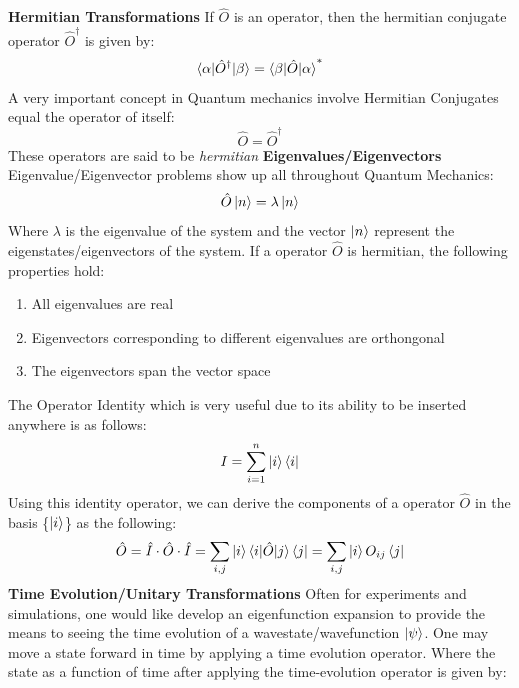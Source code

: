 \textbf{Hermitian Transformations} \newline
If $\hat{O}$ is an operator, then the hermitian conjugate operator $\hat{O}^{\dagger}$ is given by:
\begin{equation}
    \braket{\alpha|\hat{O}^{\dagger}|\beta} = \braket{\beta|\hat{O}|\alpha}^{*}
\end{equation}
A very important concept in Quantum mechanics involve Hermitian Conjugates equal the operator of itself:
\begin{equation}
    \hat{O} = \hat{O}^{\dagger}
\end{equation}
These operators are said to be \textit{hermitian} \newline
\textbf{Eigenvalues/Eigenvectors} \newline
Eigenvalue/Eigenvector problems show up all throughout Quantum Mechanics:
\begin{equation}
    \hat{O}\ket{n} = \lambda \ket{n}
\end{equation}
Where $\lambda$ is the eigenvalue of the system and the vector $\ket{n}$ represent the eigenstates/eigenvectors of the system. \newline
If a operator $\hat{O}$ is hermitian, the following properties hold:
\begin{enumerate}
    \item All eigenvalues are real 
    \item Eigenvectors corresponding to different eigenvalues are orthongonal 
    \item The eigenvectors span the vector space
\end{enumerate}
The Operator Identity which is very useful due to its ability to be inserted anywhere is as follows: 
\begin{equation}
    I = \sum_{i=1}^{n} \ket{i}\bra{i}
\end{equation}
Using this identity operator, we can derive the components of a operator $\hat{O}$ in the basis \{$\ket{i}$\} as the following:
\begin{equation}
    \hat{O} = \hat{I} \cdot \hat{O} \cdot \hat{I} = \sum_{i,j} \ket{i}\braket{i|\hat{O}|j}\bra{j} = \sum_{i,j} \ket{i}O_{ij}\bra{j}
\end{equation}
\textbf{Time Evolution/Unitary Transformations} \newline
Often for experiments and simulations, one would like develop an eigenfunction expansion to provide the means to seeing the time evolution of a wavestate/wavefunction $\ket{\psi}$. One may move a state forward in time by applying a time evolution operator. Where the state as a function of time after applying the time-evolution operator is given by:

